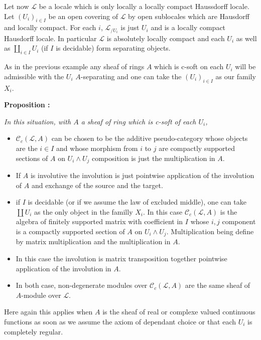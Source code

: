 \documentclass[a4paper]{article}
\newcommand{\Lcal}{\mathcal{L}}
\newcommand{\Ccal}{\mathcal{C}}
\newcommand{\block}[1]
{

\par \subsubsection{} #1

\bigskip}
\newcommand{\Prop}[1]
	{

	\bigskip
	
	\textbf{Proposition : }{\itshape #1}
		
	\bigskip
	
	}
\begin{document}
\block{Let now $\Lcal$ be a locale which is only locally a locally compact Haussdorff locale.
Let $(U_i)_{i \in I}$ be an open covering of $\Lcal$ by open sublocales which are Hausdorff and locally compact. For each $i$, $\Lcal_{/U_i}$ is just $U_i$ and is a locally compact Hausdorff locale. In particular $\Lcal$ is absolutely locally compact and each $U_i$ as well as $\coprod_{i \in I} U_i$ (if $I$ is decidable) form separating objects.

As in the previous example any sheaf of rings $A$ which is c-soft on each $U_i$ will be admissible with the $U_i$ $A$-separating and one can take the $(U_i)_{i \in I}$ as our family $X_i$.


\Prop{In this situation, with $A$ a sheaf of ring which is c-soft of each $U_i$,

\begin{itemize}
\item  $\Ccal_c(\Lcal,A)$ can be chosen to be the additive pseudo-category whose objects are the $i \in I$ and whose morphism from $i$ to $j$ are compactly supported sections of $A$ on $U_i \wedge U_j$ composition is just the multiplication in $A$.

\item If $A$ is involutive the involution is just pointwise application of the involution of $A$ and exchange of the source and the target.

\item if $I$ is decidable (or if we assume the law of excluded middle), one can take $\coprod U_i$ as the only object in the familly $X_i$. In this case $\Ccal_c(\Lcal, A)$ is the algebra of finitely supported matrix with coefficient in $I$ whose $i,j$ component is a compactly supported section of $A$ on $U_i \wedge U_j$. Multiplication being define by matrix multiplication and the multiplication in $A$. 

\item In this case the involution is matrix transposition together pointwise application of the involution in $A$.

\item In both case, non-degenerate modules over $\Ccal_c(\Lcal,A)$ are the same sheaf of $A$-module over $\Lcal$.

\end{itemize}
}

Here again this applies when $A$ is the sheaf of real or complexe valued continuous functions as soon as we assume the axiom of dependant choice or that each $U_i$ is completely regular.

}
\end{document}
